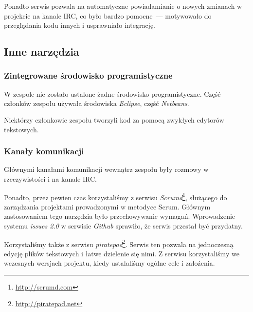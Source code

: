 Ponadto serwis pozwala na automatyczne powiadamianie o nowych zmianach w projekcie na kanale IRC, co było bardzo pomocne~--- motywowało do przeglądania kodu innych i usprawniało integrację.

\subsection{Inne narzędzia}
\subsubsection{Zintegrowane środowisko programistyczne}
W zespole nie zostało ustalone żadne środowisko programistyczne.
Część członków zespołu używała środowiska \emph{Eclipse}, część \emph{Netbeans}.

Niektórzy członkowie zespołu tworzyli kod za pomocą zwykłych edytorów tekstowych.

\subsubsection{Kanały komunikacji}
Głównymi kanałami komunikacji wewnątrz zespołu były rozmowy w rzeczywistości i na kanale IRC.

Ponadto, przez pewien czas korzystaliśmy z serwisu \emph{Scrumd}\footnote{\url{http://scrumd.com}}, służącego do zarządzania projektami prowadzonymi w metodyce Scrum.
Głównym zastosowaniem tego narzędzia było przechowywanie wymagań.
Wprowadzenie systemu \emph{issues 2.0} w serwisie \emph{Github} sprawiło, że serwis przestał być przydatny.

Korzystaliśmy także z serwisu \emph{piratepad}\footnote{\url{http://piratepad.net}}.
Serwis ten pozwala na jednoczesną edycję plików tekstowych i łatwe dzielenie się nimi.
Z serwisu korzystaliśmy we wczesnych wersjach projektu, kiedy ustalaliśmy ogólne cele i założenia.

